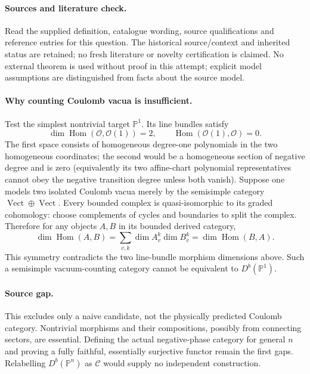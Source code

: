 \documentclass[11pt]{article}
\begin{document}
\paragraph{Sources and literature check.}
Read the supplied definition, catalogue wording, source qualifications and reference entries for this question. The historical source/context and inherited status are retained; no fresh literature or novelty certification is claimed. No external theorem is used without proof in this attempt; explicit model assumptions are distinguished from facts about the source model.

\paragraph{Why counting Coulomb vacua is insufficient.} Test the simplest nontrivial target \(\mathbb P^1\). Its line bundles satisfy
\[
 \dim\operatorname{Hom}(\mathcal O,\mathcal O(1))=2,
 \qquad \operatorname{Hom}(\mathcal O(1),\mathcal O)=0.
\]
The first space consists of homogeneous degree-one polynomials in the two homogeneous coordinates; the second would be a homogeneous section of negative degree and is zero (equivalently its two affine-chart polynomial representatives cannot obey the negative transition degree unless both vanish).
Suppose one models two isolated Coulomb vacua merely by the semisimple category \(\operatorname{Vect}\oplus\operatorname{Vect}\). Every bounded complex is quasi-isomorphic to its graded cohomology: choose complements of cycles and boundaries to split the complex. Therefore for any objects \(A,B\) in its bounded derived category,
\[
 \dim\operatorname{Hom}(A,B)=\sum_{v,k}\dim A_v^k\dim B_v^k
 =\dim\operatorname{Hom}(B,A).
\]
This symmetry contradicts the two line-bundle morphism dimensions above. Such a semisimple vacuum-counting category cannot be equivalent to \(D^b(\mathbb P^1)\).
\paragraph{Source gap.} This excludes only a naive candidate, not the physically predicted Coulomb category. Nontrivial morphisms and their compositions, possibly from connecting sectors, are essential. Defining the actual negative-phase category for general \(n\) and proving a fully faithful, essentially surjective functor remain the first gaps. Relabelling \(D^b(\mathbb P^n)\) as \(\mathcal C\) would supply no independent construction.
\end{document}
